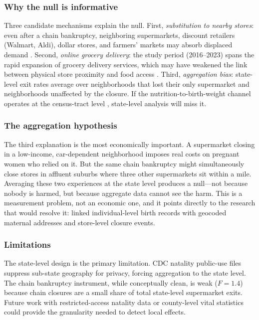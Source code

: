 \documentclass[12pt]{article}
\begin{document}
\subsubsection*{Why the null is informative} Three candidate mechanisms explain the null. First, \textit{substitution to nearby stores}: even after a chain bankruptcy, neighboring supermarkets, discount retailers (Walmart, Aldi), dollar stores, and farmers' markets may absorb displaced demand \citep{courtemanche2019supersizing}. Second, \textit{online grocery delivery}: the study period (2016--2023) spans the rapid expansion of grocery delivery services, which may have weakened the link between physical store proximity and food access \citep{handbury2015goods}. Third, \textit{aggregation bias}: state-level exit rates average over neighborhoods that lost their only supermarket and neighborhoods unaffected by the closure. If the nutrition-to-birth-weight channel operates at the census-tract level \citep{larson2009neighborhood, rhone2019low}, state-level analysis will miss it.

\subsubsection*{The aggregation hypothesis} The third explanation is the most economically important. A supermarket closing in a low-income, car-dependent neighborhood imposes real costs on pregnant women who relied on it. But the same chain bankruptcy might simultaneously close stores in affluent suburbs where three other supermarkets sit within a mile. Averaging these two experiences at the state level produces a null---not because nobody is harmed, but because aggregate data cannot see the harm. This is a measurement problem, not an economic one, and it points directly to the research that would resolve it: linked individual-level birth records with geocoded maternal addresses and store-level closure events.

\subsubsection*{Limitations} The state-level design is the primary limitation. CDC natality public-use files suppress sub-state geography for privacy, forcing aggregation to the state level. The chain bankruptcy instrument, while conceptually clean, is weak ($F = 1.4$) because chain closures are a small share of total state-level supermarket exits. Future work with restricted-access natality data or county-level vital statistics could provide the granularity needed to detect local effects.
\end{document}
